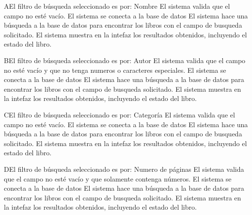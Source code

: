 		\begin{UCtrayectoriaA}{A}{El filtro de búsqueda seleccionado es por: Nombre}
			\UCpaso[\UCsist] El sistema valida que el campo no esté vacío. 
			\UCpaso[\UCsist] El sistema se conecta a la base de datos 
			\UCpaso[\UCsist] El sistema hace una búsqueda a la base de datos para encontrar los libros con el campo de busqueda solicitado. 
			\UCpaso[\UCsist] El sistema muestra en la intefaz  los resultados obtenidos, incluyendo el estado del libro.
		\end{UCtrayectoriaA}

		\begin{UCtrayectoriaA}{B}{El filtro de búsqueda seleccionado es por: Autor}
			\UCpaso[\UCsist] El sistema valida que el campo no esté vacío y que no tenga numeros o caracteres especiales. 
			\UCpaso[\UCsist] El sistema se conecta a la base de datos 
			\UCpaso[\UCsist] El sistema hace una búsqueda a la base de datos para encontrar los libros con el campo de busqueda solicitado. 
			\UCpaso[\UCsist] El sistema muestra en la intefaz  los resultados obtenidos, incluyendo el estado del libro.
		\end{UCtrayectoriaA}

		\begin{UCtrayectoriaA}{C}{El filtro de búsqueda seleccionado es por: Categoría}
			\UCpaso[\UCsist] El sistema valida que el campo no esté vacío. 
			\UCpaso[\UCsist] El sistema se conecta a la base de datos 
			\UCpaso[\UCsist] El sistema hace una búsqueda a la base de datos para encontrar los libros con el campo de busqueda solicitado. 
			\UCpaso[\UCsist] El sistema muestra en la intefaz  los resultados obtenidos, incluyendo el estado del libro.
		\end{UCtrayectoriaA}

		\begin{UCtrayectoriaA}{D}{El filtro de búsqueda seleccionado es por: Numero de páginas}
			\UCpaso[\UCsist] El sistema valida que el campo no esté vacío y que solamente contenga números. 
			\UCpaso[\UCsist] El sistema se conecta a la base de datos 
			\UCpaso[\UCsist] El sistema hace una búsqueda a la base de datos para encontrar los libros con el campo de busqueda solicitado. 
			\UCpaso[\UCsist] El sistema muestra en la intefaz  los resultados obtenidos, incluyendo el estado del libro.
		\end{UCtrayectoriaA}

